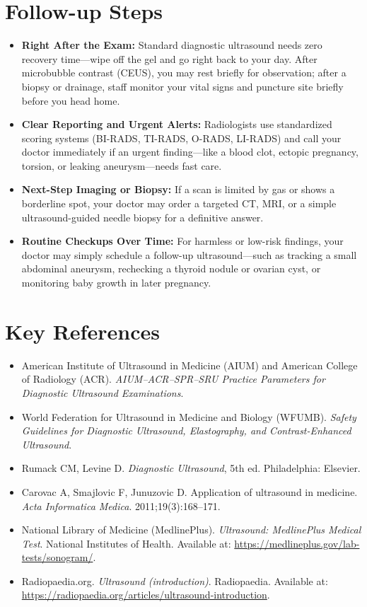\section{Follow-up Steps}

\begin{itemize}
    \item \textbf{Right After the Exam:} Standard diagnostic ultrasound needs zero recovery time---wipe off the gel and go right back to your day. After microbubble contrast (CEUS), you may rest briefly for observation; after a biopsy or drainage, staff monitor your vital signs and puncture site briefly before you head home.
    \item \textbf{Clear Reporting and Urgent Alerts:} Radiologists use standardized scoring systems (BI-RADS, TI-RADS, O-RADS, LI-RADS) and call your doctor immediately if an urgent finding---like a blood clot, ectopic pregnancy, torsion, or leaking aneurysm---needs fast care.
    \item \textbf{Next-Step Imaging or Biopsy:} If a scan is limited by gas or shows a borderline spot, your doctor may order a targeted CT, MRI, or a simple ultrasound-guided needle biopsy for a definitive answer.
    \item \textbf{Routine Checkups Over Time:} For harmless or low-risk findings, your doctor may simply schedule a follow-up ultrasound---such as tracking a small abdominal aneurysm, rechecking a thyroid nodule or ovarian cyst, or monitoring baby growth in later pregnancy.
\end{itemize}

\section{Key References}

\begin{itemize}
    \item American Institute of Ultrasound in Medicine (AIUM) and American College of Radiology (ACR). \textit{AIUM--ACR--SPR--SRU Practice Parameters for Diagnostic Ultrasound Examinations}.
    \item World Federation for Ultrasound in Medicine and Biology (WFUMB). \textit{Safety Guidelines for Diagnostic Ultrasound, Elastography, and Contrast-Enhanced Ultrasound}.
    \item Rumack CM, Levine D. \textit{Diagnostic Ultrasound}, 5th ed. Philadelphia: Elsevier.
    \item Carovac A, Smajlovic F, Junuzovic D. Application of ultrasound in medicine. \textit{Acta Informatica Medica}. 2011;19(3):168--171.
    \item National Library of Medicine (MedlinePlus). \textit{Ultrasound: MedlinePlus Medical Test}. National Institutes of Health. Available at: \url{https://medlineplus.gov/lab-tests/sonogram/}.
    \item Radiopaedia.org. \textit{Ultrasound (introduction)}. Radiopaedia. Available at: \url{https://radiopaedia.org/articles/ultrasound-introduction}.
\end{itemize}

